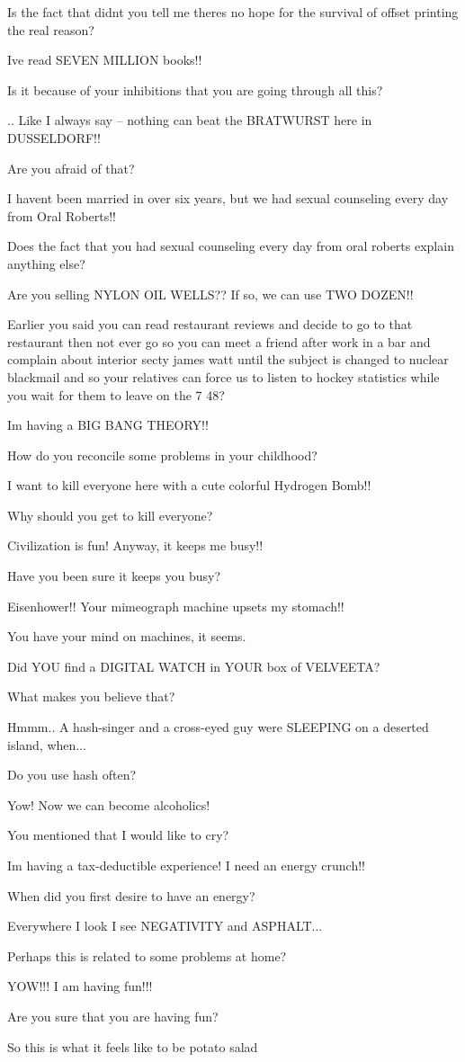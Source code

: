 \documentclass[cropmarks, frame, english]{idamasterthesis}
\begin{document}
Is the fact that didnt you tell me theres no hope for the survival
of offset printing the real reason?

Ive read SEVEN MILLION books!!

Is it because of your inhibitions that you are going through all this?

..  Like I always say -- nothing can beat the BRATWURST
 here in DUSSELDORF!!

Are you afraid of that?

I havent been married in over six years, but we had sexual counseling
 every day from Oral Roberts!!

Does the fact that you had sexual counseling every day from oral
roberts explain anything else?

Are you selling NYLON OIL WELLS??  If so, we can use TWO DOZEN!!

Earlier you said you can read restaurant reviews and decide to go to
that restaurant then not ever go so you can meet a friend after work
in a bar and complain about interior secty james watt until the
subject is changed to nuclear blackmail and so your relatives can
force us to listen to hockey statistics while you wait for them to
leave on the 7 48?

Im having a BIG BANG THEORY!!

How do you reconcile some problems in your childhood?

I want to kill everyone here with a cute colorful Hydrogen Bomb!!

Why should you get to kill everyone?

Civilization is fun!  Anyway, it keeps me busy!!

Have you been sure it keeps you busy?

Eisenhower!!  Your mimeograph machine upsets my stomach!!

You have your mind on machines, it seems.

Did YOU find a DIGITAL WATCH in YOUR box of VELVEETA?

What makes you believe that?

Hmmm..  A hash-singer and a cross-eyed guy were SLEEPING on a deserted
 island, when...

Do you use hash often?

Yow!  Now we can become alcoholics!

You mentioned that I would like to cry?

Im having a tax-deductible experience!  I need an energy crunch!!

When did you first desire to have an energy?

Everywhere I look I see NEGATIVITY and ASPHALT...

Perhaps this is related to some problems at home?

YOW!!!  I am having fun!!!

Are you sure that you are having fun?

So this is what it feels like to be potato salad
\end{document}
